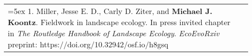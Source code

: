 \begin{longtable}{@{} >{\raggedright}p{5.25in} >{\raggedleft}X @{}}

\hangindent=5ex 1. Miller, Jesse E. D., Carly D. Ziter, and \textbf{Michael J. Koontz}. Fieldwork in landscape ecology. In press invited chapter in \emph{The Routledge Handbook of Landscape Ecology}. \newline \emph{EcoEvoRxiv} preprint: https://doi.org/10.32942/osf.io/h8gsq & 2021 \tabularnewline

\end{longtable}
